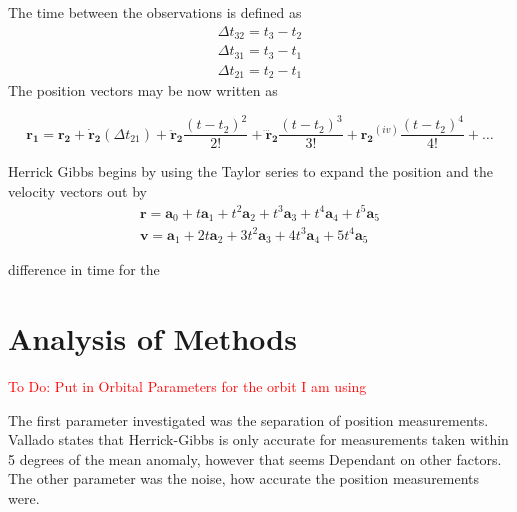 \documentclass[12pt]{article}
\begin{document}
		The time between the observations is defined as 
		\begin{equation}
		\begin{array} { l } { \Delta t _ { 32 } = t _ { 3 } - t _ { 2 } } \\ { \Delta t _ { 31 } = t _ { 3 } - t _ { 1 } } \\ { \Delta t _ { 21 } = t _ { 2 } - t _ { 1 } } \end{array}
		\end{equation}
		The position vectors may be now written as 
		
		\begin{equation}
		\mathbf{r_1}=\mathbf{r_2}+\mathbf{\dot{r}_2} (\Delta t _ { 21 } ) + \mathbf{\ddot{r}_2} \frac{(t-t_2)^2}{2!}+ \mathbf{\dddot{r}_2} \frac{(t-t_2)^3}{3!}+ \mathbf{{r_2}}^{(iv)} \frac{(t-t_2)^4}{4!}+\dots
		\end{equation}

	
	
	Herrick Gibbs begins by using the Taylor series to expand the position and the velocity vectors out by 
	\begin{equation}
	\begin{array} { l } { \mathbf { r } = \mathbf { a } _ { 0 } + t \mathbf { a } _ { 1 } + t ^ { 2 } \mathbf { a } _ { 2 } + t ^ { 3 } \mathbf { a } _ { 3 } + t ^ { 4 } \mathbf { a } _ { 4 } + t ^ { 5 } \mathbf { a } _ { 5 } } \\ { \mathbf { v } = \mathbf { a } _ { 1 } + 2 t \mathbf { a } _ { 2 } + 3 t ^ { 2 } \mathbf { a } _ { 3 } + 4 t ^ { 3 } \mathbf { a } _ { 4 } + 5 t ^ { 4 } \mathbf { a } _ { 5 } } \end{array}
	\end{equation}
	
	
	

	
	difference in time for the 
	\fi
	\section{Analysis of Methods}
	\textcolor{red}{To Do: Put in Orbital Parameters for the orbit I am using}
	
	The first parameter investigated was the separation of position measurements.  Vallado\cite{vallado2007fundamentals} states that Herrick-Gibbs is only accurate for measurements taken within 5 degrees of the mean anomaly, however that seems Dependant on other factors. The other parameter was the noise, how accurate the position measurements were. 
	
\end{document}

